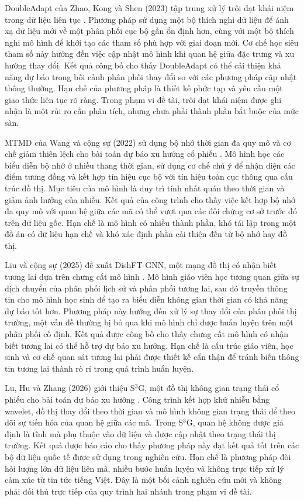 \documentclass[12pt, a4paper, oneside]{report}
\begin{document}
DoubleAdapt của Zhao, Kong và Shen (2023) tập trung xử lý trôi dạt khái niệm trong dữ liệu liên tục \cite{Zhao2023_230609862v3}. Phương pháp sử dụng một bộ thích nghi dữ liệu để ánh xạ dữ liệu mới về một phân phối cục bộ gần ổn định hơn, cùng với một bộ thích nghi mô hình để khởi tạo các tham số phù hợp với giai đoạn mới. Cơ chế học siêu tham số này hướng đến việc cập nhật mô hình khi quan hệ giữa đặc trưng và xu hướng thay đổi. Kết quả công bố cho thấy DoubleAdapt có thể cải thiện khả năng dự báo trong bối cảnh phân phối thay đổi so với các phương pháp cập nhật thông thường. Hạn chế của phương pháp là thiết kế phức tạp và yêu cầu một giao thức liên tục rõ ràng. Trong phạm vi đề tài, trôi dạt khái niệm được ghi nhận là một rủi ro cần phân tích, nhưng chưa phải thành phần bắt buộc của mức sàn.

MTMD của Wang và cộng sự (2022) sử dụng bộ nhớ thời gian đa quy mô và cơ chế giảm thiên lệch cho bài toán dự báo xu hướng cổ phiếu \cite{Wang2022_221208656v2}. Mô hình học các biểu diễn bộ nhớ ở nhiều thang thời gian, sử dụng cơ chế chú ý để nhận diện các điểm tương đồng và kết hợp tín hiệu cục bộ với tín hiệu toàn cục thông qua cấu trúc đồ thị. Mục tiêu của mô hình là duy trì tính nhất quán theo thời gian và giảm ảnh hưởng của nhiễu. Kết quả của công trình cho thấy việc kết hợp bộ nhớ đa quy mô với quan hệ giữa các mã có thể vượt qua các đối chứng cơ sở trước đó trên dữ liệu gốc. Hạn chế là mô hình có nhiều thành phần, khó tái lập trong một đồ án có dữ liệu hạn chế và khó xác định phần cải thiện đến từ bộ nhớ hay đồ thị.

Liu và cộng sự (2025) đề xuất DishFT-GNN, một mạng đồ thị có nhận biết tương lai dựa trên chưng cất mô hình \cite{Liu2025_250210776v1}. Mô hình giáo viên học tương quan giữa sự dịch chuyển của phân phối lịch sử và phân phối tương lai, sau đó truyền thông tin cho mô hình học sinh để tạo ra biểu diễn không gian thời gian có khả năng dự báo tốt hơn. Phương pháp này hướng đến xử lý sự thay đổi của phân phối thị trường, một vấn đề thường bị bỏ qua khi mô hình chỉ được huấn luyện trên một phân phối cố định. Kết quả được công bố cho thấy chưng cất mô hình có nhận biết tương lai có thể hỗ trợ dự báo xu hướng. Hạn chế là cấu trúc giáo viên, học sinh và cơ chế quan sát tương lai phải được thiết kế cẩn thận để tránh biến thông tin tương lai thành rò rỉ trong quá trình huấn luyện.

Lu, Hu và Zhang (2026) giới thiệu S$^{3}$G, một đồ thị không gian trạng thái cổ phiếu cho bài toán dự báo xu hướng \cite{Lu2026_260324236v1}. Công trình kết hợp khử nhiễu bằng wavelet, đồ thị thay đổi theo thời gian và mô hình không gian trạng thái để theo dõi sự tiến hóa của quan hệ giữa các mã. Trong S$^{3}$G, quan hệ không được giả định là tĩnh mà phụ thuộc vào dữ liệu và được cập nhật theo trạng thái thị trường. Kết quả được báo cáo cho thấy phương pháp này đạt kết quả tốt trên các bộ dữ liệu quốc tế được sử dụng trong nghiên cứu. Hạn chế là phương pháp đòi hỏi lượng lớn dữ liệu liên mã, nhiều bước huấn luyện và không trực tiếp xử lý cảm xúc từ tin tức tiếng Việt. Đây là một bối cảnh nghiên cứu mới và không phải đối thủ trực tiếp của quy trình hai nhánh trong phạm vi đề tài.
\end{document}

